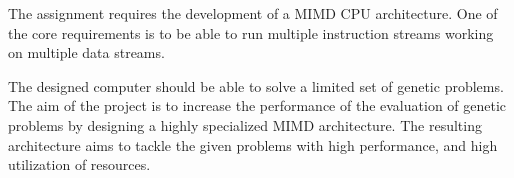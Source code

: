 The assignment requires the development of a MIMD CPU architecture.
One of the core requirements is to be able to run multiple instruction streams working on multiple data streams.

The designed computer should be able to solve a limited set of genetic problems.
The aim of the project is to increase the performance of the evaluation of genetic problems by designing a highly specialized MIMD architecture.
The resulting architecture aims to tackle the given problems with high performance, and high utilization of resources.
